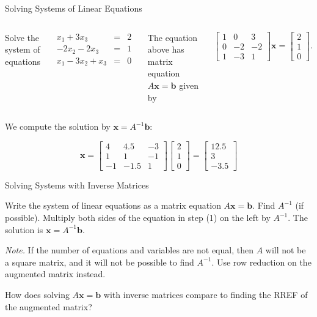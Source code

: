 \documentclass[xcolor=dvipsnames,aspectratio=169,t]{beamer}
\begin{document}
\begin{frame}{Solving Systems of Linear Equations}

\begin{columns}[T]

\column{0.5\tw}

Solve the system of equations

\[ \begin{array}{rcl}
x_1+3x_3 &=&  2\\
-2x_2-2x_3 &=& 1\\
x_1-3x_2+x_3 &=& 0 \end{array} \]

\column{0.5\tw}

The equation above has matrix equation $A\mathbf{x} = \mathbf{b}$ given by

\[ \begin{bmatrix} 1 & 0 & 3 \\ 0 & -2 & -2\\ 1 & -3 & 1 \end{bmatrix} \mathbf{x} = \begin{bmatrix} 2 \\ 1 \\ 0 \end{bmatrix} . \]

\end{columns}
\bigskip

\pause
We compute the solution by $\mathbf{x} = A^{-1}\mathbf{b}$:

\[ \mathbf{x} = \begin{bmatrix}
4 & 4.5 & -3 \\
1 & 1 & -1 \\
-1 & -1.5 & 1 \end{bmatrix}  \begin{bmatrix} 2 \\ 1 \\ 0 \end{bmatrix}  = \begin{bmatrix}
12.5 \\ 3 \\ -3.5 \end{bmatrix} \]

\end{frame}


\begin{frame}{Solving Systems with Inverse Matrices}

\bb
\ii Write the system of linear equations as a matrix equation $A \mathbf{x} = \mathbf{b}$.
\ii Find $A^{-1}$ (if possible). 
\ii Multiply both sides of the equation in step (1) on the left by $A^{-1}$.
\ii The solution is $\mathbf{x} = A^{-1} \mathbf{b}$.
\ee

\bs

\bbox
\emph{Note.} If the number of equations and variables are not equal, then $A$ will not be a square matrix, and it will not be possible to find $A^{-1}$. Use row reduction on the augmented matrix instead.
\ebox
\bigskip

\pause
How does solving $A\mathbf{x}=\mathbf{b}$ with inverse matrices \alert{compare} to finding the RREF of the augmented matrix?

\end{frame}
\end{document}
